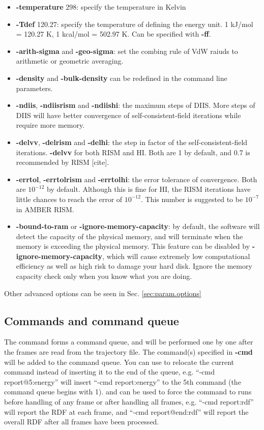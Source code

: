 \documentclass[aip,amsmath,amssymb,reprint,onecolumn]{revtex4-1}
\newcommand{\citemark}{\color{red}}
\begin{document}
\begin{itemize}
    \item {\bf -temperature} 298: specify the temperature in Kelvin
    \item {\bf -Tdef} 120.27: specify the temperature of defining the energy unit. 1 kJ/mol = 120.27 K, 1 kcal/mol = 502.97 K. Can be specified with {\bf -ff}.
    \item {\bf -arith-sigma} and {\bf -geo-sigma}: set the combing rule of VdW raiuds to arithmetic or geometric averaging.
    \item {\bf -density} and {\bf -bulk-density} can be redefined in the command line parameters.
    \item {\bf -ndiis}, {\bf -ndiisrism} and {\bf -ndiishi}: the maximum steps of DIIS. More steps of DIIS will have better convergence of self-consistent-field iterations while require more memory.
    \item {\bf -delvv}, {\bf -delrism} and {\bf -delhi}: the step in factor of the self-consistent-field iterations. {\bf -delvv} for both RISM and HI. Both are 1 by default, and 0.7 is recommended by RISM {\citemark [cite]}.
    \item {\bf -errtol}, {\bf -errtolrism} and {\bf -errtolhi}: the error tolerance of convergence. Both are $10^{-12}$ by default. Although this is fine for HI, the RISM iterations have little chances to reach the error of $10^{-12}$. This number is suggested to be $10^{-7}$ in AMBER RISM.
    \item {\bf -bound-to-ram} or {\bf -ignore-memory-capacity}: by default, the software will detect the capacity of the physical memory, and will terminate when the memory is exceeding the physical memory. This feature can be disabled by {\bf -ignore-memory-capacity}, which will cause extremely low computational efficiency as well as high risk to damage your hard disk. Ignore the memory capacity check only when you know what you are doing.
\end{itemize}

Other advanced options can be seen in Sec. \ref{sec:param.options}

\subsection{Commands and command queue}\label{sec:param.command}

The command forms a command queue, and will be performed one by one after the frames are read from the trajectory file. The command(s) specified in {\bf -cmd} will be added to the command queue. You can use \@ to relocate the current command instead of inserting it to the end of the queue, e.g. ``-cmd report@5:energy'' will insert ``-cmd report:energy'' to the 5th command (the command queue begins with 1). \@b and \@e can be used to force the command to runs before handling of any frame or after handling all frames, e.g. ``-cmd report:rdf'' will report the RDF at each frame, and ``-cmd report@end:rdf'' will report the overall RDF after all frames have been processed.
\end{document}
